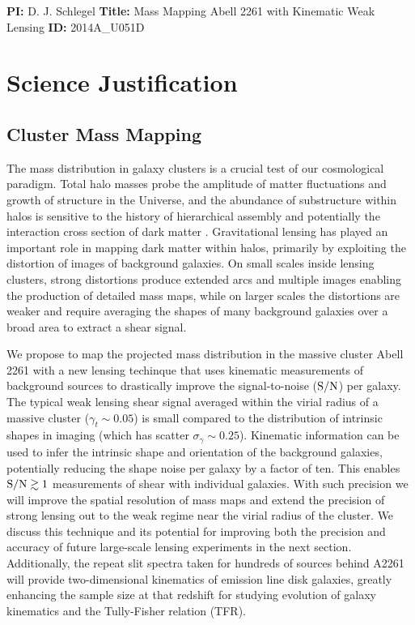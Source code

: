 \documentclass[12pt]{article}
\begin{document}
\textbf{PI:} D. J. Schlegel \textbf{Title:} Mass Mapping Abell 2261 with Kinematic Weak Lensing \textbf{ID:} 2014A\_U051D

\section{Science Justification}


\subsection{Cluster Mass Mapping}

The mass distribution in galaxy clusters is a crucial test of our cosmological paradigm. Total halo masses probe the amplitude of matter fluctuations and growth of structure in the Universe, and the abundance of substructure within halos is sensitive to the history of hierarchical assembly and potentially the interaction cross section of dark matter \citep[e.g.,][]{Natarajan2002a, Natarajan2002b, Voit2005, Clowe2006}. Gravitational lensing has played an important role in mapping dark matter within halos, primarily by exploiting the distortion of images of background galaxies. On small scales inside lensing clusters, strong distortions produce extended arcs and multiple images enabling the production of detailed mass maps, while on larger scales the distortions are weaker and require averaging the shapes of many background galaxies over a broad area to extract a shear signal.

We propose to map the projected mass distribution in the massive cluster Abell 2261 with a new lensing techinque that uses kinematic measurements of background sources to drastically improve the signal-to-noise (${\rm S/N}$) per galaxy. The typical weak lensing shear signal averaged within the virial radius of a massive cluster ($\gamma_t\sim0.05$) is small compared to the distribution of intrinsic shapes in imaging (which has scatter $\sigma_\gamma\sim0.25$). Kinematic information can be used to infer the intrinsic shape and orientation of the background galaxies, potentially reducing the shape noise per galaxy by a factor of ten. This enables ${\rm S/N}\gtrsim1$ measurements of shear with individual galaxies. With such precision we will improve the spatial resolution of mass maps and extend the precision of strong lensing out to the weak regime near the virial radius of the cluster. We discuss this technique and its potential for improving both the precision and accuracy of future large-scale lensing experiments in the next section. Additionally, the repeat slit spectra taken for hundreds of sources behind A2261 will provide two-dimensional kinematics of emission line disk galaxies, greatly enhancing the sample size at that redshift for studying evolution of galaxy kinematics and the Tully-Fisher relation (TFR).
\end{document}
